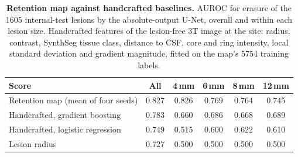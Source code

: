 \begin{table}[!htbp]
{\caption{\textbf{Retention map against handcrafted baselines.} AUROC for erasure of the 1605 internal-test lesions by the absolute-output U-Net, overall and within each lesion size. Handcrafted features of the lesion-free 3T image at the site: radius, contrast, SynthSeg tissue class, distance to CSF, core and ring intensity, local standard deviation and gradient magnitude, fitted on the map's 5754 training labels.}}
{\scriptsize\setlength{\tabcolsep}{3pt}\begin{tabular*}{\linewidth}{@{\extracolsep{\fill}}lccccc@{}}
\toprule
Score & All & 4\,mm & 6\,mm & 8\,mm & 12\,mm \\
\midrule
Retention map (mean of four seeds) & 0.827 & 0.826 & 0.769 & 0.764 & 0.745 \\
Handcrafted, gradient boosting & 0.783 & 0.660 & 0.686 & 0.668 & 0.689 \\
Handcrafted, logistic regression & 0.749 & 0.515 & 0.600 & 0.622 & 0.610 \\
Lesion radius & 0.727 & 0.500 & 0.500 & 0.500 & 0.500 \\
\bottomrule
\end{tabular*}}
\end{table}
